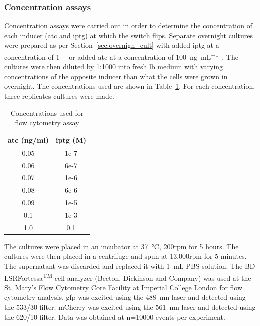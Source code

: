 \subsubsection{Concentration assays}
\label{sec:flo_conc}
Concentration assays were carried out in order to determine the concentration of each inducer (\acrshort{atc} and \acrshort{iptg}) at which the switch flips.  Separate overnight cultures were prepared as per Section~\ref{sec:overnigh_cult} with added \acrshort{iptg} at a concentration of \SI{1}{\milli\molar} or added \acrshort{atc} at a concentration of \SI{100}{\nano\gram\per\milli\liter}~\autocite{Litcofsky:2012gr}. The cultures were then diluted by 1:1000 into fresh \acrshort{lb} medium with varying concentrations of the opposite inducer than what the cells were grown in overnight. The concentrations used are shown in Table~\ref{tab:flow_conc}. For each concentration. three replicates cultures were made.


\begin{table}[htbp]
\centering
\caption{Concentrations used for flow cytometry assay}
\label{tab:flow_conc}
\begin{tabular}{@{}cc@{}}
\toprule
\acrshort{atc} (ng/ml)  & \acrshort{iptg} (M) \\ \midrule
0.05 & 1e-7 \\
0.06 & 6e-7 \\
0.07 & 1e-6 \\
0.08 & 6e-6 \\
0.09 & 1e-5 \\
0.1  & 1e-3 \\
1.0  & 0.1  \\ \bottomrule
\end{tabular}
\end{table}

The cultures were placed in an incubator at \SI{37}{\celsius}, 200rpm for 5 hours. The cultures were then placed in a centrifuge and spun at 13,000rpm for 5 minutes. The supernatant was discarded and replaced it with \SI{1}{\milli\liter} PBS solution. The BD LSRFortessa\textsuperscript{TM} cell analyzer (Becton, Dickinson and Company) was used at the St. Mary's Flow Cytometry Core Facility at Imperial College London  for flow cytometry analysis. \acrshort{gfp} was excited using the \SI{488}{\nano\meter} laser and detected using the 533/30 filter. mCherry was excited using the \SI{561}{\nano\meter} laser and detected using the 620/10 filter. Data was obtained at n=10000 events per experiment. 

